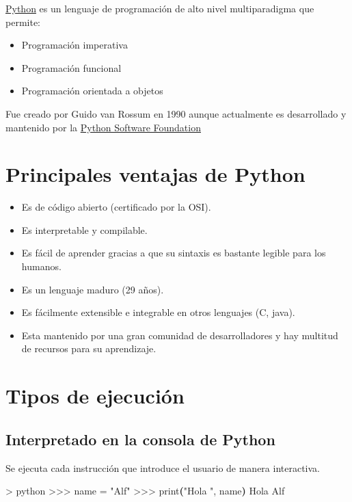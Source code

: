 \documentclass[
  spanish,
  a4paper,
]{scrreport}
\newenvironment{Shaded}{\begin{snugshade}}{\end{snugshade}}
\newcommand{\ExtensionTok}[1]{\textcolor[rgb]{0.00,0.23,0.31}{#1}}
\newcommand{\KeywordTok}[1]{\textcolor[rgb]{0.00,0.23,0.31}{\textbf{#1}}}
\newcommand{\NormalTok}[1]{\textcolor[rgb]{0.00,0.23,0.31}{#1}}
\newcommand{\OperatorTok}[1]{\textcolor[rgb]{0.37,0.37,0.37}{#1}}
\newcommand{\StringTok}[1]{\textcolor[rgb]{0.13,0.47,0.30}{#1}}
\providecommand{\tightlist}{%
  \setlength{\itemsep}{0pt}\setlength{\parskip}{0pt}}
\begin{document}
\href{https://www.python.org/}{Python} es un lenguaje de programación de
alto nivel multiparadigma que permite:

\begin{itemize}
\tightlist
\item
  Programación imperativa
\item
  Programación funcional
\item
  Programación orientada a objetos
\end{itemize}

Fue creado por Guido van Rossum en 1990 aunque actualmente es
desarrollado y mantenido por la
\href{https://www.python.org/psf-landing/}{Python Software Foundation}

\section{Principales ventajas de
Python}\label{principales-ventajas-de-python}

\begin{itemize}
\tightlist
\item
  Es de código abierto (certificado por la OSI).
\item
  Es interpretable y compilable.
\item
  Es fácil de aprender gracias a que su sintaxis es bastante legible
  para los humanos.
\item
  Es un lenguaje maduro (29 años).
\item
  Es fácilmente extensible e integrable en otros lenguajes (C, java).
\item
  Esta mantenido por una gran comunidad de desarrolladores y hay
  multitud de recursos para su aprendizaje.
\end{itemize}

\section{Tipos de ejecución}\label{tipos-de-ejecuciuxf3n}

\subsection{Interpretado en la consola de
Python}\label{interpretado-en-la-consola-de-python}

Se ejecuta cada instrucción que introduce el usuario de manera
interactiva.

\begin{Shaded}
\begin{Highlighting}[]
\OperatorTok{\textgreater{}}\NormalTok{ python}
\OperatorTok{\textgreater{}\textgreater{}\textgreater{}}\NormalTok{ name }\ExtensionTok{=} \StringTok{"Alf"}
\OperatorTok{\textgreater{}\textgreater{}\textgreater{}}\NormalTok{ print}\KeywordTok{(}\StringTok{"Hola "}\ExtensionTok{,}\NormalTok{ name}\KeywordTok{)}
\ExtensionTok{Hola}\NormalTok{ Alf}
\end{Highlighting}
\end{Shaded}
\end{document}
